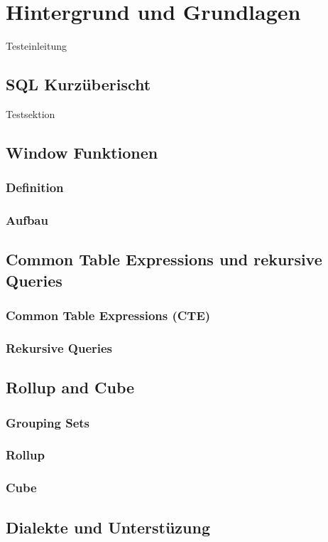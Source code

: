 \chapter{Hintergrund und Grundlagen}
Testeinleitung

\section{SQL Kurzüberischt}
Testsektion \cite{adobe}

\section{Window Funktionen}

\subsection{Definition}

\subsection{Aufbau}




\section{Common Table Expressions und rekursive Queries}

\subsection{Common Table Expressions (CTE)}

\subsection{Rekursive Queries}




\section{Rollup and Cube}

\subsection{Grouping Sets}

\subsection{Rollup}

\subsection{Cube}



\section{Dialekte und Unterstüzung}